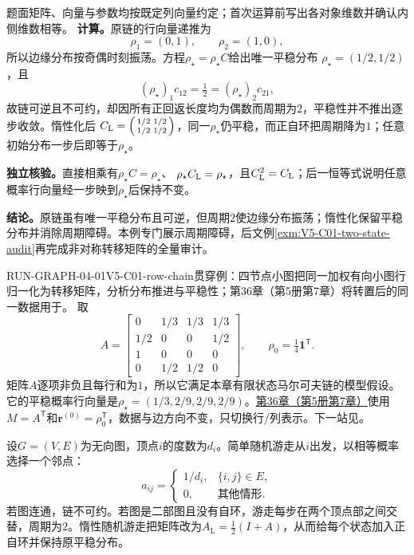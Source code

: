 \begin{solution}
\SolGiven 题面矩阵、向量与参数均按既定列向量约定；首次运算前写出各对象维数并确认内侧维数相等。
\SolDerive
\textbf{计算。}原链的行向量递推为
\[
\rho_1=(0,1),\qquad \rho_2=(1,0),
\]
所以边缘分布按奇偶时刻振荡。方程$\rho_\star=\rho_\star C$给出唯一平稳分布
$\rho_\star=(1/2,1/2)$，且
\[
 (\rho_\star)_1c_{12}=\tfrac12=(\rho_\star)_2c_{21},
\]
故链可逆且不可约，却因所有正回返长度均为偶数而周期为$2$，平稳性并不推出逐步收敛。惰性化后
$C_{\rm L}=\begin{psmallmatrix}1/2&1/2\\1/2&1/2\end{psmallmatrix}$，同一$\rho_\star$仍平稳，而正自环把周期降为$1$；任意初始分布一步后即等于$\rho_\star$。

\textbf{独立核验。}直接相乘有$\rho_\star C=\rho_\star$、
$\rho_\star C_{\rm L}=\rho_\star$，且$C_{\rm L}^2=C_{\rm L}$；后一恒等式说明任意概率行向量经一步映到$\rho_\star$后保持不变。

\textbf{结论。}原链虽有唯一平稳分布且可逆，但周期$2$使边缘分布振荡；惰性化保留平稳分布并消除周期障碍。本例专门展示周期障碍，后文例\ref{exm:V5-C01-two-state-audit}再完成非对称转移矩阵的全量审计。
\end{solution}

\begin{SLRunningExample}{RUN-GRAPH-04-01}{V5-C01-row-chain}{贯穿例：四节点小图}{把同一加权有向小图行归一化为转移矩阵，分析分布推进与平稳性；第36章（第5册第7章）将转置后的同一数据用于\PageRank{}。}
取
\[
A=\begin{bmatrix}
0&1/3&1/3&1/3\\1/2&0&0&1/2\\1&0&0&0\\0&1/2&1/2&0
\end{bmatrix},
\qquad \rho_0=\tfrac14\boldsymbol1^{\mathsf T}.
\]
矩阵$A$逐项非负且每行和为$1$，所以它满足本章有限状态马尔可夫链的模型假设。它的平稳概率行向量是$\rho_\star=(1/3,2/9,2/9,2/9)$。\hyperref[chap:V5-C07]{第36章（第5册第7章）}使用$M=A^{\mathsf T}$和$\boldsymbol r^{(0)}=\rho_0^{\mathsf T}$，数据与边方向不变，只切换行/列表示。下一站见。
\end{SLRunningExample}
设$G=(V,E)$为无向图，顶点$i$的度数为$d_i$。简单随机游走从$i$出发，以相等概率选择一个邻点：
\begin{equation}\label{eq:V5-C01-graph-walk}
a_{ij}=\begin{cases}
1/d_i,&\{i,j\}\in E,\\
0,&\text{其他情形}.
\end{cases}
\end{equation}
若图连通，链不可约。若图是二部图且没有自环，游走每步在两个顶点部之间交替，周期为$2$。惰性随机游走把矩阵改为$A_{\mathrm L}=\tfrac12(I+A)$，从而给每个状态加入正自环并保持原平稳分布。


